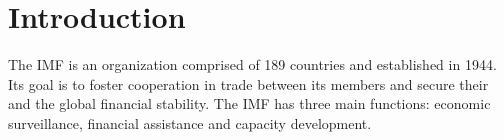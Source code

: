 \section{Introduction}
\label{sec:introduction}
The \gls{IMF} is an organization comprised of 189 countries and established in 1944. Its goal is to foster cooperation in trade between its members and secure their and the global financial stability. The \gls{IMF} has three main functions: economic surveillance, financial assistance and capacity development.